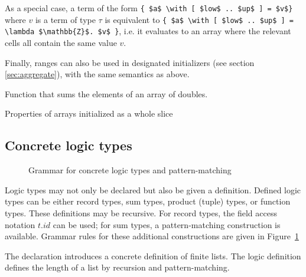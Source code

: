 \begin{description}
As a special case, a term of the form
\lstinline|{ $a$ \with [ $low$ .. $up$ ] = $v$}| where $v$ is a term of type
$\tau$ is equivalent to
\lstinline|{ $a$ \with [ $low$ .. $up$ ] = \lambda $\mathbb{Z}$. $v$ }|, i.e.
it evaluates to an array where the relevant cells all contain the same
value $v$.

Finally, ranges can also be used in designated initializers
(see section \ref{sec:aggregate}), with the same semantics as above.
\end{description}


\begin{example}
  \label{ex:higherorder}
  Function that sums the elements of an array of doubles.
\end{example}

\begin{example}
  \label{ex:arraysliceupdate}
  Properties of arrays initialized as a whole slice
\end{example}

\subsection{Concrete logic types}\label{sec:concrete-logic-types}
\label{sec:concretetypes}
\experimental

\begin{figure}[htp]
  \begin{cadre}
      
    \end{cadre}
  \caption{Grammar for concrete logic types and pattern-matching}
\label{fig:gram:logictype}
\end{figure}

Logic types may not only be declared but also be given a
definition. Defined logic types can be either record
types, sum
types, product (tuple) types, or function types. These definitions may be recursive.
For record types, the field access notation $t.id$ can be used;
for sum types, a pattern-matching construction is available.
Grammar rules for these additional constructions are given in
Figure~\ref{fig:gram:logictype}

\begin{example}
  The declaration
  introduces a concrete definition of finite lists. The logic definition
  defines the length of a list by recursion and pattern-matching.
\end{example}


